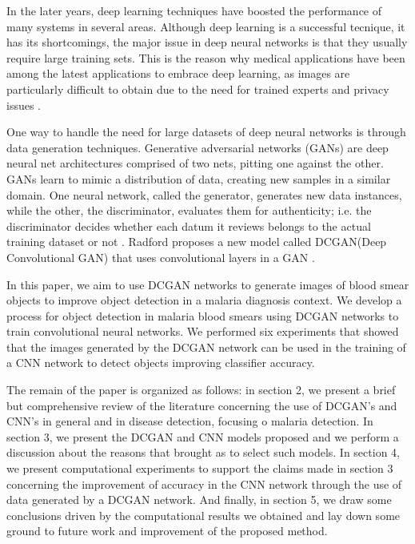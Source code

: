 In the later years, deep learning techniques have boosted the performance of many systems in several areas. Although deep learning is a successful tecnique, it has its shortcomings, the major issue in deep neural networks is that they usually require large training sets. This is the reason why medical applications have been among the latest applications to embrace deep learning, as images are particularly difficult to obtain due to the need for trained experts and privacy issues \cite{Dong2017a}. 

One way to handle the need for large datasets of deep neural networks is through data generation techniques. Generative adversarial networks (GANs) are deep neural net architectures comprised of two nets, pitting one against the other. GANs learn to mimic a distribution of data,  creating new samples in a similar domain. One neural network, called the generator, generates new data instances, while the other, the discriminator, evaluates them for authenticity; i.e. the discriminator decides whether each datum it reviews belongs to the actual training dataset or not  \cite{Goodfellow2014}.  Radford proposes a new model called DCGAN(Deep Convolutional GAN) that uses convolutional layers in a GAN \cite{Radford2015UnsupervisedNetworks}.

In this paper, we aim to use DCGAN networks to generate images of blood smear objects to improve object detection in a malaria diagnosis context. We develop a process for object detection in malaria blood smears using DCGAN networks to train convolutional neural networks. We performed six experiments that showed that the images generated by the DCGAN network can be used in the training of a CNN network to detect objects improving classifier accuracy.

The remain of the paper is organized as follows: in section 2, we present a brief but comprehensive review of the literature concerning the use of DCGAN's and CNN's in general and in disease detection, focusing o malaria detection. In section 3, we present the DCGAN and CNN models proposed and we perform a discussion about the reasons that brought as to select such models. In section 4, we present computational experiments to support the claims made in section 3 concerning the improvement of accuracy in the CNN network through the use of data generated by a DCGAN network. And finally, in section 5, we draw some conclusions driven by the computational results we obtained and lay down some ground to future work and improvement of the proposed method.